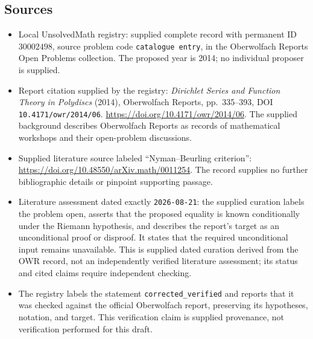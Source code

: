 \documentclass[11pt]{article}
\begin{document}
\subsection{Sources}
\begin{itemize}
\item Local UnsolvedMath registry: supplied complete record with permanent ID \(30002498\), source problem code \texttt{catalogue entry}, in the Oberwolfach Reports Open Problems collection. The proposed year is 2014; no individual proposer is supplied.
\item Report citation supplied by the registry: \emph{Dirichlet Series and Function Theory in Polydiscs} (2014), Oberwolfach Reports, pp.~335--393, DOI \texttt{10.4171/owr/2014/06}. \url{https://doi.org/10.4171/owr/2014/06}. The supplied background describes Oberwolfach Reports as records of mathematical workshops and their open-problem discussions.
\item Supplied literature source labeled ``Nyman--Beurling criterion'': \url{https://doi.org/10.48550/arXiv.math/0011254}. The record supplies no further bibliographic details or pinpoint supporting passage.
\item Literature assessment dated exactly \texttt{2026-08-21}: the supplied curation labels the problem open, asserts that the proposed equality is known conditionally under the Riemann hypothesis, and describes the report's target as an unconditional proof or disproof. It states that the required unconditional input remains unavailable. This is supplied dated curation derived from the OWR record, not an independently verified literature assessment; its status and cited claims require independent checking.
\item The registry labels the statement \texttt{corrected\_verified} and reports that it was checked against the official Oberwolfach report, preserving its hypotheses, notation, and target. This verification claim is supplied provenance, not verification performed for this draft.
\end{itemize}
\end{document}
